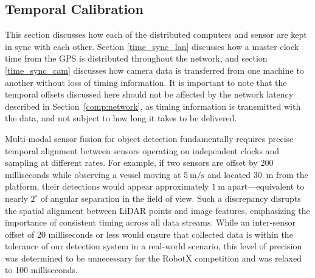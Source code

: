 \documentclass{erauthesis}
\begin{document}





\subsection{Temporal Calibration} \label{time_sync}
% 

This section discusses how each of the distributed computers and sensor are kept in sync with each other.
Section \ref{time_sync_lan} discusses how a master clock time from the GPS is distributed throughout the network, and section \ref{time_sync_cam} discusses how camera data is transferred from one machine to another without loss of timing information.
It is important to note that the temporal offsets discussed here should not be affected by the network latency described in Section~\ref{comp:network}, as timing information is transmitted with the data, and not subject to how long it takes to be delivered. 



Multi-modal sensor fusion for object detection fundamentally requires precise temporal alignment between sensors operating on independent clocks and sampling at different rates.  
For example, if two sensors are offset by 200 milliseconds while observing a vessel moving at $5~\mathrm{m/s}$ and located 30~m from the platform, their detections would appear approximately $1~\mathrm{m}$ apart—equivalent to nearly $2^{\circ}$ of angular separation in the field of view.  
Such a discrepancy disrupts the spatial alignment between LiDAR points and image features, emphasizing the importance of consistent timing across all data streams.
While an inter-sensor offset of 20 milliseconds or less would ensure that collected data is within the tolerance of our detection system in a real-world scenario, this level of precision was determined to be unnecessary for the RobotX competition and was relaxed to 100 milliseconds.
\end{document}
